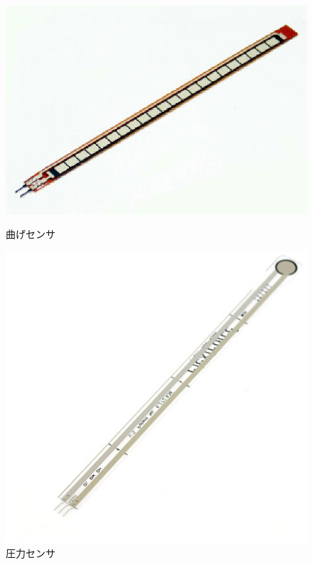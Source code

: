 \documentclass[11pt,a4paper]{jarticle}
\begin{document}
\begin{figure}[htbp]
 \begin{minipage}{0.5\columnwidth}
  \centering
  \includegraphics[width=\columnwidth]{img/flex_sensor.eps}
  \caption{曲げセンサ}
  \label{flex}
 \end{minipage}
 \begin{minipage}{0.5\columnwidth}
  \centering
  \includegraphics[width=\columnwidth]{img/pressure_sensor.eps}
  \caption{圧力センサ}
  \label{pressure}
 \end{minipage}
\end{figure}
\end{document}
